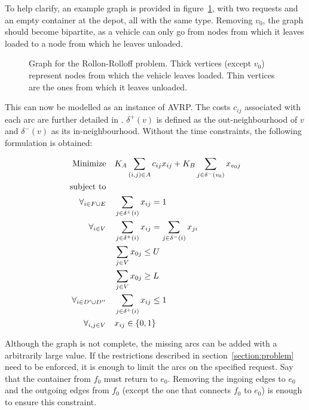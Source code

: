 To help clarify, an example graph is provided in figure~\ref{fig:avrp-rr}, with
two requests and an empty container at the depot, all with the same type.
Removing $v_0$, the graph should become bipartite, as a vehicle can only go
from nodes from which it leaves loaded to a node from which he leaves unloaded.

\begin{figure}[th]
  \begin{center}
    \leavevmode
    
    \caption{Graph for the Rollon-Rolloff problem. Thick vertices (except
    $v_0$) represent nodes from which the vehicle leaves loaded. Thin vertices
    are the ones from which it leaves unloaded.}
    \label{fig:avrp-rr}
  \end{center}
\end{figure}

This can now be modelled as an instance of AVRP. The costs $c_{ij}$ associated
with each arc are further detailed in \citet{Aringhieri04}.  $\delta^+(v)$ is
defined as the out-neighbourhood of $v$ and $\delta^-(v)$ as its
in-neighbourhood. Without the time constraints, the following formulation is
obtained:

\begin{align}
	\mbox{Minimize} & \quad K_A \sum_{(i, j) \in A} c_{ij} x_{ij} +
				K_B \sum_{j \in \delta^-(v_0)} x_{v_0j}
	\\
	\mbox{subject to} & \notag{}
	\\
	\forall_{i \in F \cup E} & \quad \sum_{j \in \delta^+(i)} x_{ij} = 1
	\label{avrp-rr:indegree}
	\\
	\forall_{i \in V} & \quad \sum_{j \in \delta^+(i)} x_{ij} = \sum_{j \in \delta^-(i)} x_{ji}
	\label{avrp-rr:in-out}
	\\
	& \quad \sum_{j \in V} x_{0j} \leq U \label{avrp-rr:upper-k} \\
	& \quad \sum_{j \in V} x_{0j} \geq L \label{avrp-rr:lower-k} \\
	\forall_{i \in D^\prime \cup D^{\prime\prime}} & \quad \sum_{j \in \delta^+(i)} x_{ij} \leq 1 \\
	\forall_{i, j \in V} & \quad x_{ij} \in \{0, 1\}
\end{align}

Although the graph is not complete, the missing arcs can be added with a
arbitrarily large value. If the restrictions described in
section~\ref{section:problem} need to be enforced, it is enough to limit the arcs on
the specified request. Say that the container from $f_0$ must return to $e_0$.
Removing the ingoing edges to $e_0$ and the outgoing edges from $f_0$ (except
the one that connects $f_0$ to $e_0$) is enough to ensure this constraint.




